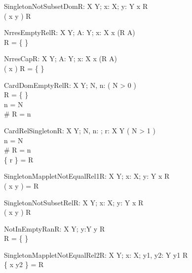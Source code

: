 \begin{theorem}{SingletonNotSubsetDom}{R: X \rel Y; x: X; y: Y}
x \notin \dom R \\
\dom \se( x \mapsto y ) \subset \dom R
\end{theorem}


\begin{theorem}{NrresEmptyRel}{R: X \rel Y; A: \power Y; x: X}
x \in \dom (R \nrres A) \\
R = \{ \}
\end{theorem}

\begin{theorem}{NrresCap}{R: X \rel Y; A: \power Y; x: X}
x \in \dom (R \nrres A) \\
\se( x ) \cap \dom R = \{ \}
\end{theorem}

\begin{theorem}{CardDomEmptyRel}{R: X \rel Y; \const N, n: \nat}
\eval( N > 0 ) \\
R = \{ \} \\
n = N \\
\# \dom R = n
\end{theorem}

\begin{theorem}{CardRelSingleton}{R: X \rel Y; \const N, n: \nat; r: X \cross Y}
\eval( N > 1 ) \\
n = N \\
\# \dom R = n \\
\{ r \} = R
\end{theorem}

\begin{theorem}{SingletonMappletNotEqualRel1}{R: X \rel Y; x: X; y: Y}
x \notin \dom R \\
\se( x \mapsto y ) = R
\end{theorem}

\begin{theorem}{SingletonNotSubsetRel}{R: X \rel Y; x: X; y: Y}
x \notin \dom R \\
\se( x \mapsto y ) \subset R
\end{theorem}

\begin{theorem}{NotInEmptyRan}{R: X \rel Y; y:Y}
y \in \ran R \\
R = \{ \}
\end{theorem}

\begin{theorem}{SingletonMappletNotEqualRel2}{R: X \rel Y; x: X; \const y1, \const y2: Y}
y1 \in \ran R \\
\{ x \mapsto y2 \} = R
\end{theorem}

